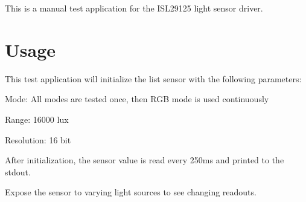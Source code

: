 This is a manual test application for the I\+S\+L29125 light sensor driver.

\section*{Usage}

This test application will initialize the list sensor with the following parameters\+:
\begin{DoxyItemize}
\item Mode\+: All modes are tested once, then R\+GB mode is used continuously
\item Range\+: 16000 lux
\item Resolution\+: 16 bit
\end{DoxyItemize}

After initialization, the sensor value is read every 250ms and printed to the stdout.

Expose the sensor to varying light sources to see changing readouts. 